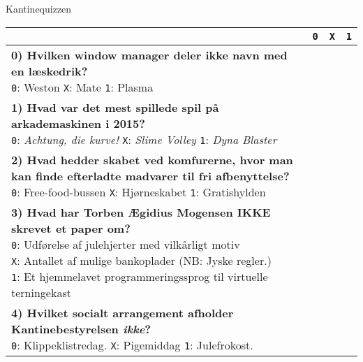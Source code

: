 \documentclass[a4paper]{article}
\begin{document}
\begin{center}
{\Huge Kantinequizzen} \\
\vspace{0.4cm}

\begin{tabular}{|p{12cm}|p{0.2cm}|p{0.2cm}|p{0.2cm}|}
\hline
\vspace{0.2cm}
& \texttt{0} & \texttt{X} & \texttt{1} \\\hline
\parbox{12cm}{
  \vspace{0.2cm}
  \textbf{0) Hvilken window manager deler ikke navn med en læskedrik?} \\
  \texttt{0}: Weston \quad
  \texttt{X}: Mate \quad
  \texttt{1}: Plasma 
  \vspace{0.1cm}
} & & & \\\hline
\parbox{12cm}{
  \vspace{0.2cm}
  \textbf{1) Hvad var det mest spillede spil på arkademaskinen i 2015?} \\
  \texttt{0}: \textit{Achtung, die kurve!}    \quad
  \texttt{X}: \textit{Slime Volley}
  \texttt{1}: \textit{Dyna Blaster} 
  \vspace{0.1cm}
} & & & \\\hline
\parbox{12cm}{
  \vspace{0.2cm}
  \textbf{2) Hvad hedder skabet ved komfurerne, hvor man kan finde
  efterladte madvarer til fri afbenyttelse?} \\
  \texttt{0}: Free-food-bussen \quad
  \texttt{X}: Hjørneskabet \quad
  \texttt{1}: Gratishylden 
  \vspace{0.1cm}
} & & & \\\hline
\parbox{12cm}{
  \vspace{0.2cm}
  \textbf{3) Hvad har Torben Ægidius Mogensen IKKE skrevet et paper om?}\\
  \texttt{0}: Udførelse af julehjerter med vilkårligt motiv \\
  \texttt{X}: Antallet af mulige bankoplader (NB: Jyske regler.) \\
  \texttt{1}: Et hjemmelavet programmeringssprog til virtuelle terningekast
  \vspace{0.1cm}
} & & & \\\hline
\parbox{12cm}{
  \vspace{0.2cm}
  \textbf{4) Hvilket socialt arrangement afholder Kantinebestyrelsen
  \emph{ikke}?} \\
  \texttt{0}: Klippeklistredag. \quad
  \texttt{X}: Pigemiddag \quad
  \texttt{1}: Julefrokost.
  \vspace{0.1cm}
}
\end{tabular}
\end{center}
\end{document}

